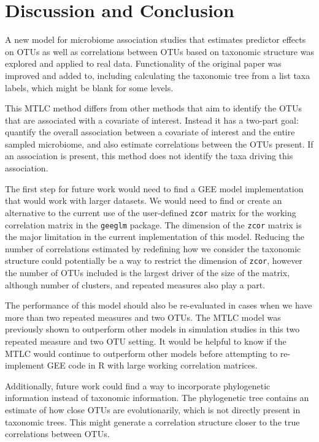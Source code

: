 \documentclass[12pt]{article}
\begin{document}
\section{Discussion and Conclusion}

A new model for microbiome association studies that estimates predictor effects on OTUs as well as correlations between OTUs based on taxonomic structure was explored and applied to real data. Functionality of the original paper was improved and added to, including calculating the taxonomic tree from a list taxa labels, which might be blank for some levels.

This MTLC method differs from other methods that aim to identify the OTUs that are associated with a covariate of interest. Instead it has a two-part goal: quantify the overall association between a covariate of interest and the entire sampled microbiome, and also estimate correlations between the OTUs present. If an association is present, this method does not identify the taxa driving this association.

The first step for future work would need to find a GEE model implementation that would work with larger datasets. We would need to find or create an alternative to the current use of the user-defined \texttt{zcor} matrix for the working correlation matrix in the \texttt{geeglm} package. The dimension of the \texttt{zcor} matrix is the major limitation in the current implementation of this model. Reducing the number of correlations estimated by redefining how we consider the taxonomic structure could potentially be a way to restrict the dimension of \texttt{zcor}, however the number of OTUs included is the largest driver of the size of the matrix, although number of clusters, and repeated measures also play a part.

The performance of this model should also be re-evaluated in cases when we have more than two repeated measures and two OTUs. The MTLC model was previously shown to outperform other models in simulation studies in this two repeated measure and two OTU setting. It would be helpful to know if the MTLC would continue to outperform other models before attempting to re-implement GEE code in R with large working correlation matrices.

Additionally, future work could find a way to incorporate phylogenetic information instead of taxonomic information. The phylogenetic tree contains an estimate of how close OTUs are evolutionarily, which is not directly present in taxonomic trees. This might generate a correlation structure closer to the true correlations between OTUs.
\end{document}
